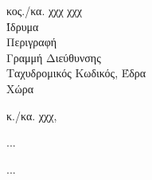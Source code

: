 \documentclass[%
  english,
  custom_invoice_asymTypB_el,
  DIV=8,
  fontsize=11pt]{scrlttr2}
\begin{document}
  \begin{letter}{κος./κα. χχχ χχχ\\
  Ίδρυμα\\
  Περιγραφή\\
  Γραμμή Διεύθυνσης\\
  Ταχυδρομικός Κωδικός, Έδρα\\
  Χώρα}

  \opening{κ./κα. χχχ,}
  \begin{flushleft}
  ...
  
  ...

  \end{flushleft}


  \end{letter}
\end{document}
